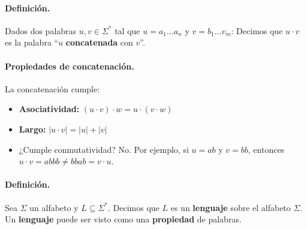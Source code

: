 \paragraph{Definición.} Dados dos palabras $u,v \in \Sigma^*$ tal que $u = a_1 \ldots a_n$ y $v = b_1 \ldots v_m$:
Decimos que $u \cdot v$ es la palabra ``$u$ \textbf{concatenada} con $v$''.

\paragraph{Propiedades de concatenación.} La concatenación cumple:
\begin{itemize}
    \item \textbf{Asociatividad:} $(u \cdot v) \cdot w = u \cdot (v \cdot w)$
    \item \textbf{Largo:} $|u\cdot v| = |u| + |v|$
    \item ¿Cumple conmutatividad? No. Por ejemplo, si $u = ab$ y $v = bb$, entonces $u \cdot v = abbb \neq bbab = v \cdot u$.
\end{itemize}

\paragraph{Definición.} Sea $\Sigma$ un alfabeto y $L \subseteq \Sigma^*$. Decimos que $L$ es un \textbf{lenguaje} sobre el alfabeto $\Sigma$.
Un \textbf{lenguaje} puede ser visto como una \textbf{propiedad} de palabras.

